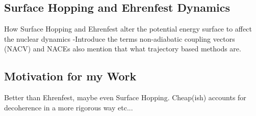 \subsection{Surface Hopping and Ehrenfest Dynamics}
{\LARGE How Surface Hopping and Ehrenfest alter the potential energy surface to affect the nuclear dynamics -Introduce the terms non-adiabatic coupling vectors (NACV) and NACEs also mention that what trajectory based methods are.}
\subsection{Motivation for my Work}
{\Large Better than Ehrenfest, maybe even Surface Hopping. Cheap(ish) accounts for decoherence in a more rigorous way etc...}
